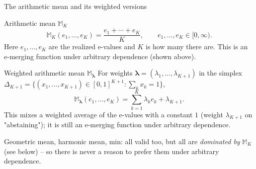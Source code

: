 \documentclass[aspectratio=169,10pt]{beamer}
\begin{document}
\begin{frame}{The arithmetic mean and its weighted versions}
  \begin{block}{Arithmetic mean $\mathbb{M}_K$}
    \[
      \mathbb{M}_K(e_1,\dots,e_K) = \frac{e_1+\cdots+e_K}{K}, \qquad e_1,\dots,e_K \in [0,\infty).
    \]
    Here $e_1,\dots,e_K$ are the realized e-values and $K$ is how many there are. This is an e-merging function under arbitrary dependence (shown above).
  \end{block}

  \begin{block}{Weighted arithmetic mean $\mathbb{M}_{\boldsymbol\lambda}$}
    For weights $\boldsymbol\lambda=(\lambda_1,\dots,\lambda_{K+1})$ in the simplex $\Delta_{K+1} = \{(x_1,\dots,x_{K+1}) \in [0,1]^{K+1} : \sum_k x_k = 1\}$,
    \[
      \mathbb{M}_{\boldsymbol\lambda}(e_1,\dots,e_K) = \sum_{k=1}^{K} \lambda_k e_k + \lambda_{K+1}.
    \]
    This mixes a weighted average of the e-values with a constant $1$ (weight $\lambda_{K+1}$ on "abstaining"); it is still an e-merging function under arbitrary dependence.
  \end{block}
  Geometric mean, harmonic mean, min: all valid too, but all are \emph{dominated by} $\mathbb{M}_K$ (see below) -- so there is never a reason to prefer them under arbitrary dependence.
\end{frame}
\end{document}
